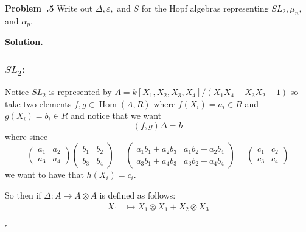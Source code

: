 \documentclass[12pt]{article}
\DeclareMathOperator{\Hom}{Hom}
\newenvironment{prob}[1]{\par\smallskip
	\noindent\begin{mdframed}\small \textbf{Problem~\thesection.#1} \rmfamily\quad}{\end{mdframed}\medskip}
\newenvironment{sol}{\noindent \textbf{Solution.} \,}{\\\hspace*{\fill}$\square$\medskip}
\begin{document}
\begin{prob}{5}
	Write out $\Delta,\varepsilon,$ and $S$ for the Hopf algebras representing $SL_2, \mu_n,$ and $\alpha_p$.
\end{prob}
\begin{sol}
	\subsubsection*{$SL_2$:}
	Notice $SL_2$ is represented by $A=k[X_1,X_2,X_3,X_4]/(X_1X_4-X_3X_2-1)$ so take two elements
	$f,g\in\Hom(A,R)$ where $f(X_i)=a_i\in R$ and $g(X_i)=b_i\in R$ and notice that we want
	\[(f,g)\Delta=h\]
	where since
	\[\begin{pmatrix}
		a_1 & a_2\\ a_3 & a_4
	\end{pmatrix}\begin{pmatrix}
		b_1 & b_2\\ b_3 & b_4
	\end{pmatrix}=\begin{pmatrix}
		a_1b_1+a_2b_3 & a_1b_2+a_2b_4\\ a_3b_1+a_4b_3 & a_3b_2+a_4b_4
	\end{pmatrix}=\begin{pmatrix}
		c_1 & c_2\\ c_3 & c_4
	\end{pmatrix}\]
	we want to have that $h(X_i)=c_i.$

	So then if $\Delta:A\to A\otimes A$ is defined as follows:
	\begin{align*}
		X_1&\mapsto X_1\otimes X_1+X_2\otimes X_3
	\end{align*}
\end{sol}
\end{document}
